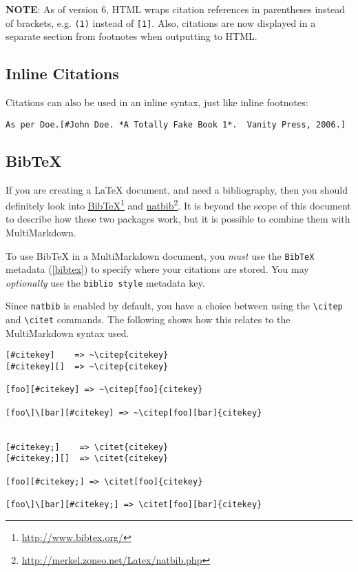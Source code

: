 \textbf{NOTE}: As of version 6, HTML wraps citation references in parentheses instead of brackets, e.g. \texttt{(1)} instead of \texttt{[1]}. Also, citations are now displayed in a separate section from footnotes when outputting to HTML.

\subsection{Inline Citations }
\label{inlinecitations}

Citations can also be used in an inline syntax, just like inline footnotes:

\begin{verbatim}
As per Doe.[#John Doe. *A Totally Fake Book 1*.  Vanity Press, 2006.]
\end{verbatim}

\subsection{BibTeX }
\label{bibtex}

If you are creating a LaTeX document, and need a bibliography, then you should definitely look into \href{http://www.bibtex.org/}{BibTeX}\footnote{\href{http://www.bibtex.org/}{http:\slash \slash www.bibtex.org\slash }} and \href{http://merkel.zoneo.net/Latex/natbib.php}{natbib}\footnote{\href{http://merkel.zoneo.net/Latex/natbib.php}{http:\slash \slash merkel.zoneo.net\slash Latex\slash natbib.php}}. It is beyond the scope of this document to describe how these two packages work, but it is possible to combine them with MultiMarkdown.

To use BibTeX in a MultiMarkdown document, you \emph{must} use the \texttt{BibTeX} metadata (\autoref{bibtex}) to specify where your citations are stored. You may \emph{optionally} use the \texttt{biblio style} metadata key.

Since \texttt{natbib} is enabled by default, you have a choice between using the \texttt{\textbackslash{}citep} and \texttt{\textbackslash{}citet} commands. The following shows how this relates to the MultiMarkdown syntax used.

\begin{verbatim}
[#citekey]    => ~\citep{citekey}
[#citekey][]  => ~\citep{citekey}

[foo][#citekey] => ~\citep[foo]{citekey}

[foo\]\[bar][#citekey] => ~\citep[foo][bar]{citekey}


[#citekey;]    => \citet{citekey}
[#citekey;][]  => \citet{citekey}

[foo][#citekey;] => \citet[foo]{citekey}

[foo\]\[bar][#citekey;] => \citet[foo][bar]{citekey}
\end{verbatim}


